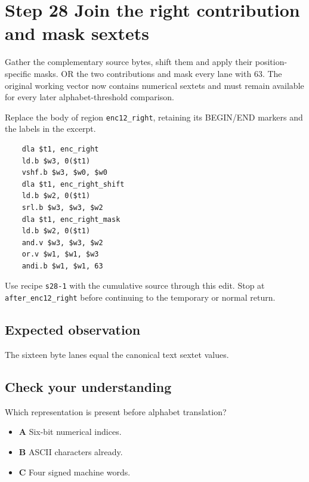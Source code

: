 \section{Step 28 Join the right contribution and mask sextets}\label{base64-s28}

Gather the complementary source bytes, shift them and apply their position-specific masks. OR the two contributions and mask every lane with 63. The original working vector now contains numerical sextets and must remain available for every later alphabet-threshold comparison.

Replace the body of region \texttt{enc12\_right}, retaining its BEGIN/END markers and the labels in the excerpt.

\begin{verbatim}
    dla $t1, enc_right
    ld.b $w3, 0($t1)
    vshf.b $w3, $w0, $w0
    dla $t1, enc_right_shift
    ld.b $w2, 0($t1)
    srl.b $w3, $w3, $w2
    dla $t1, enc_right_mask
    ld.b $w2, 0($t1)
    and.v $w3, $w3, $w2
    or.v $w1, $w1, $w3
    andi.b $w1, $w1, 63
\end{verbatim}

Use recipe \texttt{s28-1} with the cumulative source through this edit. Stop at \texttt{after\_enc12\_right} before continuing to the temporary or normal return.

\subsection{Expected observation}
The sixteen byte lanes equal the canonical text sextet values.

\subsection{Check your understanding}
Which representation is present before alphabet translation?

\begin{itemize}
  \item \textbf{A} Six-bit numerical indices.
  \item \textbf{B} ASCII characters already.
  \item \textbf{C} Four signed machine words.
\end{itemize}
